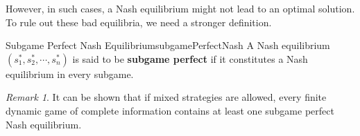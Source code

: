 \documentclass[math]{amznotes}
\theoremstyle{remark}
\newtheorem*{remark}{Remark}
\begin{document}
However, in such cases, a Nash equilibrium might not lead to an optimal solution. To rule out these bad equilibria, we need a stronger definition.
\begin{dfnbox}{Subgame Perfect Nash Equilibrium}{subgamePerfectNash}
    A Nash equilibrium $\left(s_1^*, s_2^*, \cdots, s_n^*\right)$ is said to be {\color{red} \textbf{subgame perfect}} if it constitutes a Nash equilibrium in every subgame.
\end{dfnbox}
\begin{notebox}
    \begin{remark}
        It can be shown that if mixed strategies are allowed, every finite dynamic game of complete information contains at least one subgame perfect Nash equilibrium.
    \end{remark}
\end{notebox}
\end{document}
